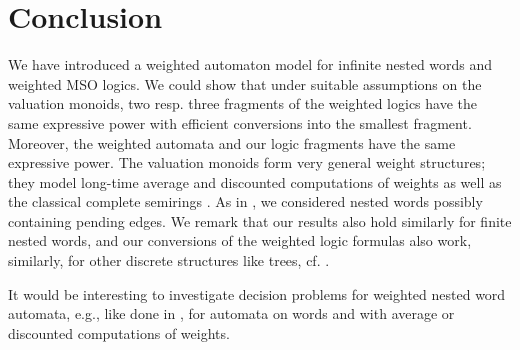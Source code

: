 \documentclass[runningheads, envcountsame, a4paper]{llncs}
\begin{document}
	\section{Conclusion} 
We have introduced a weighted automaton model for infinite nested
words and weighted MSO logics. We could show that under suitable
assumptions on the valuation monoids, two resp. three fragments of the weighted logics have the same
expressive power with efficient conversions into the smallest
fragment. Moreover, the weighted automata and our logic fragments
have the same expressive power. The valuation monoids
form very general weight structures; they model
long-time average and discounted computations of weights as well
as the classical complete semirings \cite{DG}. As in \cite{AM}, we considered
nested words possibly containing pending edges. We remark that
our results also hold similarly for finite nested words, and our conversions of the weighted logic formulas also work, similarly, for other discrete structures like trees, cf. \cite{DGMM}. 

It would be interesting to investigate decision problems for
weighted nested word automata, e.g., like done in \cite{CDH}, \cite{CDH2} 
for automata on words and with average or discounted computations
of weights.{}

\end{document}
